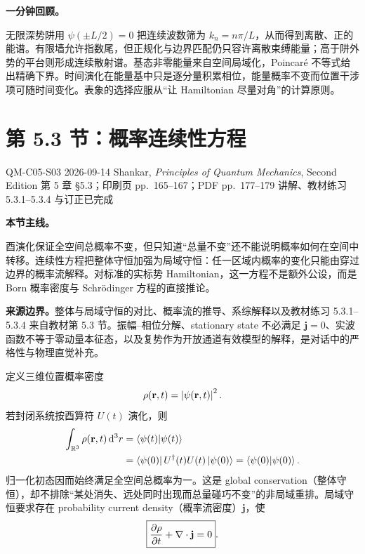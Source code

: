 \textbf{一分钟回顾。}

无限深势阱用 $\psi(\pm L/2)=0$ 把连续波数筛为 $k_n=n\pi/L$，从而得到离散、正的能谱。有限墙允许指数尾，但正规化与边界匹配仍只容许离散束缚能量；高于阱外势的平台则形成连续散射谱。基态非零能量来自空间局域化，Poincar\'e 不等式给出精确下界。时间演化在能量基中只是逐分量积累相位，能量概率不变而位置干涉项可随时间变化。表象的选择应服从“让 Hamiltonian 尽量对角”的计算原则。

\section{第 5.3 节：概率连续性方程}
\label{section:QM-C05-S03}

\studymeta
  {QM-C05-S03}
  {2026-09-14}
  {Shankar, \textit{Principles of Quantum Mechanics}, Second Edition}
  {第 5 章 \S 5.3；印刷页 pp.~165--167；PDF pp.~177--179}
  {讲解、教材练习 5.3.1--5.3.4 与订正已完成}

\textbf{本节主线。}

酉演化保证全空间总概率不变，但只知道“总量不变”还不能说明概率如何在空间中转移。连续性方程把整体守恒加强为局域守恒：任一区域内概率的变化只能由穿过边界的概率流解释。对标准的实标势 Hamiltonian，这一方程不是额外公设，而是 Born 概率密度与 Schr\"odinger 方程的直接推论。

\textbf{来源边界。}整体与局域守恒的对比、概率流的推导、系综解释以及教材练习 5.3.1--5.3.4 来自教材第 5.3 节。振幅--相位分解、stationary state 不必满足 $\mathbf j=0$、实波函数不等于零动量本征态，以及复势作为开放通道有效模型的解释，是对话中的严格性与物理直觉补充。



定义三维位置概率密度
\begin{equation}
  \rho(\mathbf r,t)=\left|\psi(\mathbf r,t)\right|^2.
  \label{eq:QM-C05-S03-density}
\end{equation}
若封闭系统按酉算符 $U(t)$ 演化，则
\begin{align}
  \int_{\mathbb{R}^3}\rho(\mathbf r,t)\mathop{}\!\mathrm{d}^3r
  &=\left\langle \psi(t) \middle| \psi(t) \right\rangle \\
  &=\left\langle \psi(0)\right|U^\dagger(t)U(t)\left|\psi(0)\right\rangle
  =\left\langle \psi(0) \middle| \psi(0) \right\rangle.
  \label{eq:QM-C05-S03-global-conservation}
\end{align}
归一化初态因而始终满足全空间总概率为一。这是 global conservation（整体守恒），却不排除“某处消失、远处同时出现而总量碰巧不变”的非局域重排。局域守恒要求存在 probability current density（概率流密度）$\mathbf j$，使
\begin{equation}
  \boxed{
  \frac{\partial \rho}{\partial t}+\nabla\cdot\mathbf j=0}.
  \label{eq:QM-C05-S03-continuity}
\end{equation}

